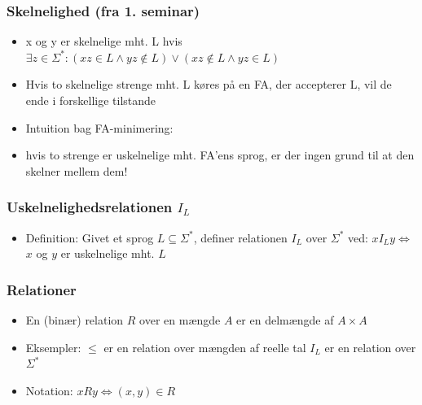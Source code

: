 \documentclass[]{beamer}
\begin{document}
\begin{frame}
\frametitle{Skelnelighed (fra 1. seminar)}
\begin{itemize}[<+->]
\item x og y er skelnelige mht. L hvis
$\exists z\in \Sigma^*: (xz\in L \wedge  yz\not\in L) \vee 
	      (xz\not\in L \wedge  yz\in L)$
\item
  Hvis to skelnelige strenge mht. L køres på en FA, 
  der accepterer L, vil de ende i forskellige tilstande
\item
Intuition bag FA-minimering:  
\item hvis to strenge er \alert{uskelnelige} mht. FA’ens sprog, er der ingen grund til at den skelner mellem dem!
\end{itemize}
\end{frame}

\begin{frame}
\frametitle{Uskelnelighedsrelationen $I_L$}
\begin{itemize}[<+->]
\item Definition:       
Givet et sprog $L\subseteq \Sigma^*$, definer 
relationen $I_L$ over $\Sigma^*$ ved:
		$x I_L y   \Leftrightarrow$   $x$ og $y$ er uskelnelige mht. $L$
\end{itemize}
\end{frame}

\begin{frame}
\frametitle{Relationer}
\begin{itemize}[<+->]
\item En (binær) relation $R$ over en mængde $A$ er 
en delmængde af $A\times A$
\item
Eksempler:
 $\leq$  er en relation over mængden af reelle tal
 $I_L$ er en relation over $\Sigma^*$
\item
Notation:    $x R y   \Leftrightarrow   (x,y)\in R$
\end{itemize}
\end{frame}
\end{document}
